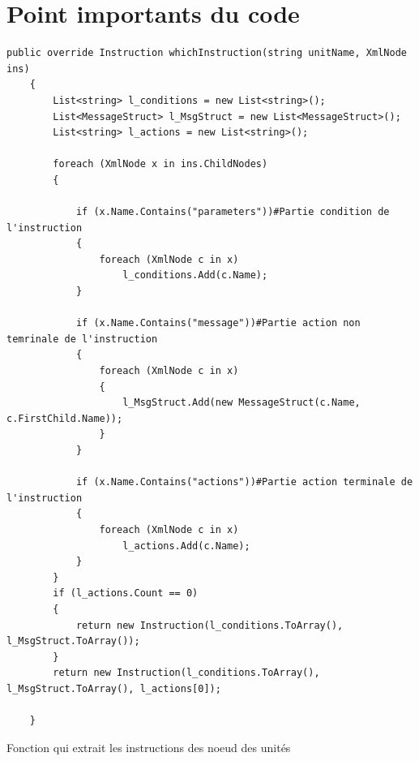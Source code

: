 \documentclass{report}
\begin{document}
\paragraph{}


\section{Point importants du code}


\begin{lstlisting}[frame=single]
 public override Instruction whichInstruction(string unitName, XmlNode ins)
    {
        List<string> l_conditions = new List<string>();
        List<MessageStruct> l_MsgStruct = new List<MessageStruct>();
        List<string> l_actions = new List<string>();

        foreach (XmlNode x in ins.ChildNodes)
        {

            if (x.Name.Contains("parameters"))#Partie condition de l'instruction
            {
                foreach (XmlNode c in x)
                    l_conditions.Add(c.Name);
            }

            if (x.Name.Contains("message"))#Partie action non temrinale de l'instruction
            {
                foreach (XmlNode c in x)
                {
                    l_MsgStruct.Add(new MessageStruct(c.Name, c.FirstChild.Name));
                }
            }

            if (x.Name.Contains("actions"))#Partie action terminale de l'instruction
            {
                foreach (XmlNode c in x)
                    l_actions.Add(c.Name);
            }
        }
        if (l_actions.Count == 0)
        {
            return new Instruction(l_conditions.ToArray(), l_MsgStruct.ToArray());
        }
        return new Instruction(l_conditions.ToArray(), l_MsgStruct.ToArray(), l_actions[0]);

    }
\end{lstlisting}
 {Fonction qui extrait les instructions des noeud des unités}
\end{document}
